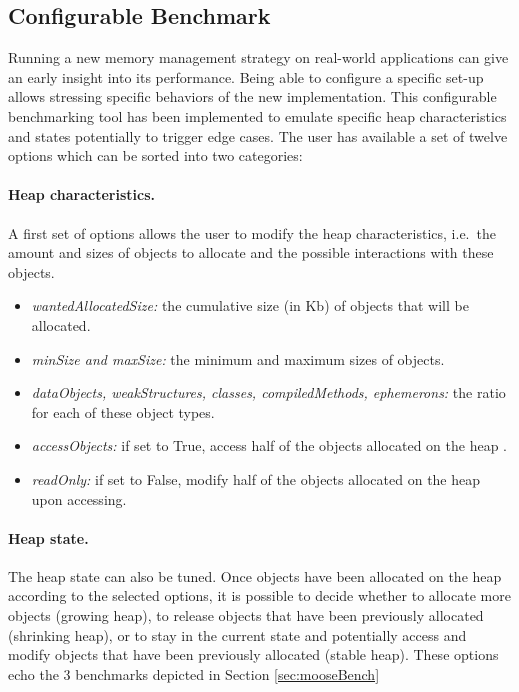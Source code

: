 \documentclass[10pt, sigplan]{acmart}
\begin{document}
\subsection{Configurable Benchmark} \label{sec:confBench}

Running a new memory management strategy on real-world applications can give an early insight into its performance. Being able to configure a specific set-up allows stressing specific behaviors of the new implementation.
This configurable benchmarking tool has been implemented to emulate specific heap characteristics and states potentially to trigger edge cases. The user has available a set of twelve options which can be sorted into two categories:

\paragraph{Heap characteristics.} A first set of options allows the user to modify the heap characteristics, i.e.\ the amount and sizes of objects to allocate and the possible interactions with these objects. 

\begin{itemize}
\item \emph{wantedAllocatedSize:} the cumulative size (in Kb) of objects that will be allocated.
\item \emph{minSize and maxSize:} the minimum and maximum sizes of objects.
\item \emph{dataObjects, weakStructures, classes, compiledMethods, ephemerons:} the ratio for each of these object types.
\item \emph{accessObjects:} if set to True, access half of the objects allocated on the heap .
\item \emph{readOnly:} if set to False, modify half of the objects allocated on the heap upon accessing.
\end{itemize}

\paragraph{Heap state.} The heap state can also be tuned. Once objects have been allocated on the heap according to the selected options, it is possible to decide whether to allocate more objects (growing heap), to release objects that have been previously allocated (shrinking heap), or to stay in the current state and potentially access and modify objects that have been previously allocated (stable heap). These options echo the 3 benchmarks depicted in Section \ref{sec:mooseBench}\\
\end{document}
